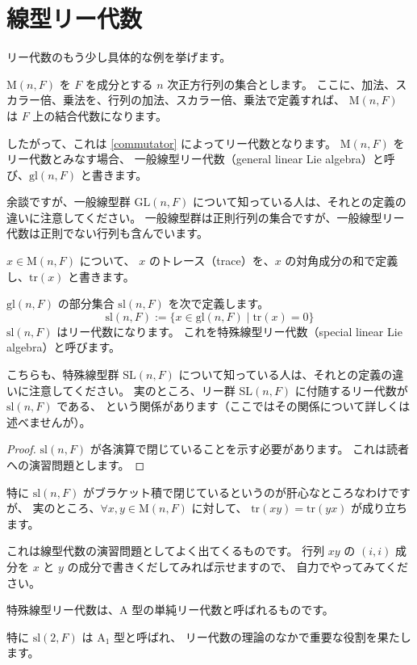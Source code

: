 \documentclass{ltjsarticle}
\begin{document}
\section{線型リー代数}

リー代数のもう少し具体的な例を挙げます。

\begin{example}[一般線型リー代数]
    \(\mathrm{M}(n,F)\) を \(F\) を成分とする \(n\) 次正方行列の集合とします。
    ここに、加法、スカラー倍、乗法を、行列の加法、スカラー倍、乗法で定義すれば、
    \(\mathrm{M}(n,F)\) は \(F\) 上の結合代数になります。

    したがって、これは \cref{commutator} によってリー代数となります。
    \(\mathrm{M}(n,F)\) をリー代数とみなす場合、
    一般線型リー代数（general linear Lie algebra）と呼び、\(\mathrm{gl}(n,F)\) と書きます。
\end{example}

余談ですが、一般線型群 \(\mathrm{GL}(n,F)\) について知っている人は、それとの定義の違いに注意してください。
一般線型群は正則行列の集合ですが、一般線型リー代数は正則でない行列も含んでいます。

\begin{definition}[行列のトレース]
    \(x \in \mathrm{M}(n,F)\) について、
    \(x\) のトレース（trace）を、\(x\) の対角成分の和で定義し、\(\mathrm{tr}(x)\) と書きます。
\end{definition}

\begin{example}[特殊線型リー代数]
    \(\mathrm{gl}(n,F)\) の部分集合 \(\mathrm{sl}(n,F)\) を次で定義します。
    \[
        \mathrm{sl}(n,F) := \{x \in \mathrm{gl}(n,F) \mid \mathrm{tr}(x) = 0\}
    \]
    \(\mathrm{sl}(n,F)\) はリー代数になります。
    これを特殊線型リー代数（special linear Lie algebra）と呼びます。
\end{example}

こちらも、特殊線型群 \(\mathrm{SL}(n,F)\) について知っている人は、それとの定義の違いに注意してください。
実のところ、リー群 \(\mathrm{SL}(n,F)\) に付随するリー代数が \(\mathrm{sl}(n,F)\) である、
という関係があります（ここではその関係について詳しくは述べませんが）。

\begin{proof}
    \(\mathrm{sl}(n,F)\) が各演算で閉じていることを示す必要があります。
    これは読者への演習問題とします。
\end{proof}

特に \(\mathrm{sl}(n,F)\) がブラケット積で閉じているというのが肝心なところなわけですが、
実のところ、\(\forall x,y \in \mathrm{M}(n,F)\) に対して、
\(\mathrm{tr}(xy) = \mathrm{tr}(yx)\) が成り立ちます。

これは線型代数の演習問題としてよく出てくるものです。
行列 \(xy\) の \((i,i)\) 成分を \(x\) と \(y\) の成分で書きくだしてみれば示せますので、
自力でやってみてください。

特殊線型リー代数は、\(\mathrm{A}\) 型の単純リー代数と呼ばれるものです。

特に \(\mathrm{sl}(2,F)\) は \(\mathrm{A}_1\) 型と呼ばれ、
リー代数の理論のなかで重要な役割を果たします。
\end{document}
